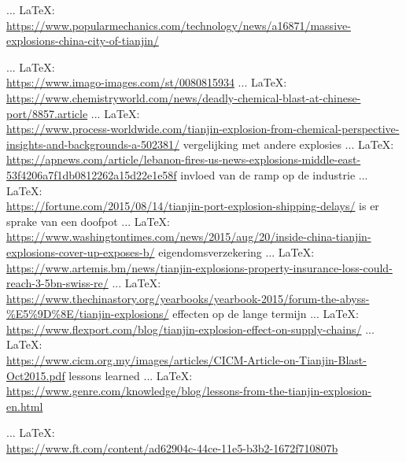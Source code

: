 \begin{thebibliography}{99}
{{{			 ... \LaTeX:\\ \url{https://www.popularmechanics.com/technology/news/a16871/massive-explosions-china-city-of-tianjin/}
			
			 ... \LaTeX:\\ \url{https://www.imago-images.com/st/0080815934}
			 ... \LaTeX:\\ \url{https://www.chemistryworld.com/news/deadly-chemical-blast-at-chinese-port/8857.article}
			 ... \LaTeX:\\ \url{https://www.process-worldwide.com/tianjin-explosion-from-chemical-perspective-insights-and-backgrounds-a-502381/}
			vergelijking met andere explosies
			 ... \LaTeX:\\ \url{https://apnews.com/article/lebanon-fires-us-news-explosions-middle-east-53f4206a7f1db0812262a15d22e1e58f}
			invloed van de ramp op de industrie
			 ... \LaTeX:\\ \url{https://fortune.com/2015/08/14/tianjin-port-explosion-shipping-delays/}
			is er sprake van een doofpot
			 ... \LaTeX:\\ \url{https://www.washingtontimes.com/news/2015/aug/20/inside-china-tianjin-explosions-cover-up-exposes-b/}
			eigendomsverzekering
			 ... \LaTeX:\\ \url{https://www.artemis.bm/news/tianjin-explosions-property-insurance-loss-could-reach-3-5bn-swiss-re/}
			 ... \LaTeX:\\ \url{https://www.thechinastory.org/yearbooks/yearbook-2015/forum-the-abyss-%E5%9D%8E/tianjin-explosions/}
			effecten op de lange termijn
			 ... \LaTeX:\\ \url{https://www.flexport.com/blog/tianjin-explosion-effect-on-supply-chains/}
			 ... \LaTeX:\\ \url{https://www.cicm.org.my/images/articles/CICM-Article-on-Tianjin-Blast-Oct2015.pdf}
			lessons learned
			 ... \LaTeX:\\ \url{https://www.genre.com/knowledge/blog/lessons-from-the-tianjin-explosion-en.html}
			
			 ... \LaTeX:\\ \url{https://www.ft.com/content/ad62904c-44ce-11e5-b3b2-1672f710807b}
			
}}}
\end{thebibliography}
